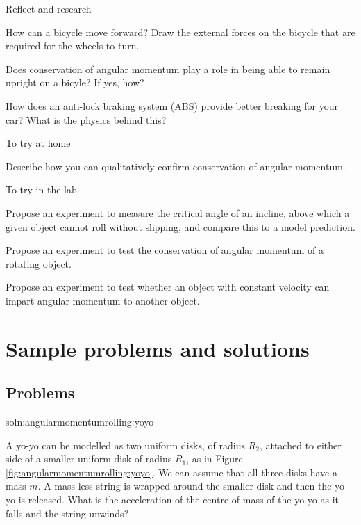 \begin{chapteractivity}{Reflect and research}
{
\item How can a bicycle move forward? Draw the external forces on the bicycle that are required for the wheels to turn.
\item Does conservation of angular momentum play a role in being able to remain upright on a bicyle? If yes, how?
\item How does an anti-lock braking system (ABS) provide better breaking for your car? What is the physics behind this?
}
\end{chapteractivity}

\begin{chapteractivity}{To try at home}
{
\item Describe how you can qualitatively confirm conservation of angular momentum. 
}
\end{chapteractivity}

\begin{chapteractivity}{To try in the lab}
{
\item Propose an experiment to measure the critical angle of an incline, above which a given object cannot roll without slipping, and compare this to a model prediction.
\item Propose an experiment to test the conservation of angular momentum of a rotating object. 
\item Propose an experiment to test whether an object with constant velocity can impart angular momentum to another object.
}
\end{chapteractivity}


\newpage
\section{Sample problems and solutions}
\subsection{Problems}
\begin{problem}{soln:angularmomentumrolling:yoyo}{\label{prob:angularmomentumrolling:yoyo} A yo-yo can be modelled as two uniform disks, of radius $R_2$, attached to either side of a smaller uniform disk of radius $R_1$, as in Figure \ref{fig:angularmomentumrolling:yoyo}. We can assume that all three disks have a mass $m$. A mass-less string is wrapped around the smaller disk and then the yo-yo is released. What is the acceleration of the centre of mass of the yo-yo as it falls and the string unwinds?

}
\end{problem}


